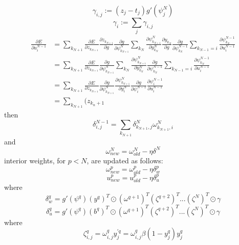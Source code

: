 \documentclass{article}
\begin{document}
%
\begin{equation} \label{eq:gamma}
\gamma_{i,j} := (z_j - t_j) g'(\psi_j^N)
\end{equation}
%
\begin{equation} \label{eq:gamma_array}
\gamma_i := \sum_j \gamma_{i,j}
\end{equation}
%
\begin{equation} \label{eq:derive_du_nm1}
\begin{aligned}
\frac{\partial E}{\partial u_i^{N-1}} &= 
\sum_{k_{N+1}} \frac{\partial E}{\partial z_{k_{N+1}}} \frac{\partial z_{k_{N+1}}}{\partial g} \frac{\partial g}{\partial \psi_{k_{N+1}}^N} \sum_{k_N} \frac{\partial \psi_{k_{N+1}}^N}{\partial y_{k_N}^N} \frac{\partial y_{k_{N}}}{\partial g} \frac{\partial g}{\partial \psi_{k_N}^{N-1}} \sum_{k_{N-1}=i} \frac{\partial \psi_{k_N}^{N-1}}{\partial u_i^{N-1}} \\
& = \sum_{k_{N+1}} \frac{\partial E}{\partial z_{k_{N+1}}} \frac{\partial g}{\partial \psi_{k_{N+1}}^N} \sum_{k_N} \frac{\partial \psi_{k_{N+1}}^N}{\partial y_{k_N}^N} \frac{\partial g}{\partial \psi_{k_N}^{N-1}} \sum_{k_{N-1}=i} \frac{\partial \psi_{k_N}^{N-1}}{\partial u_i^{N-1}} \\
& = \sum_{k_{N+1}} \frac{\partial E}{\partial z_{k_{N+1}}} \frac{\partial g}{\partial \psi_{k_{N+1}}^N} \frac{\partial \psi_{k_{N+1}}^N}{\partial y_i^N} \frac{\partial g}{\partial \psi_i^{N-1}} \frac{\partial \psi_i^{N-1}}{\partial u_i^{N-1}} \\
& = \sum_{k_{N+1}} (z_{k_n+1}
\end{aligned}
\end{equation}
%
then
%
\begin{equation} \label{eq:delta2}
\delta_{i,j}^{N-1} =
\sum_{k_{N+1}} \delta_{k_{N+1},j}^N \omega_{k_{N+1},i}^N
\end{equation}
%
and
%
\begin{equation} \label{eq:end_weights}
\omega_{new}^N = \omega_{old}^N - \eta \delta^N
\end{equation}
%
interior weights, for $p < N$, are updated as follows:
%
\begin{equation} \label{eq:w_weights}
\omega_{new}^p = \omega_{old}^p - \eta \delta_w^p
\end{equation}
%
\begin{equation} \label{eq:u_weights}
u_{new}^p = u_{old}^p - \eta \delta_u^p
\end{equation}
%
where
%
\begin{equation} \label{eq:w_delta}
\delta_w^{q} = g'(\psi^{q}) (y^{q})^T \odot (\omega^{q+1})^T (\zeta^{q+2})^T ... (\zeta^N)^T \odot \gamma
\end{equation}
%
\begin{equation} \label{eq:u_delta}
\delta_u^{q} = g'(\psi^{q}) (b^{q})^T \odot (\omega^{q+1})^T (\zeta^{q+2})^T ... (\zeta^N)^T \odot \gamma
\end{equation}
%
where
%
\begin{equation} \label{eq:u_delta}
\zeta_{i,j}^q = \omega_{i,j}^q y_j^{\prime q} = \omega_{i,j}^q \beta (1 - y_j^q) y_j^q
\end{equation}
%
\end{document}
